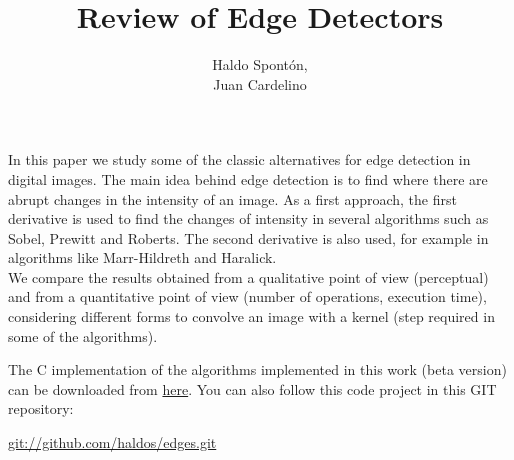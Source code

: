 \documentclass{ipol}
\numberwithin{equation}{section}
\numberwithin{table}{section}
\numberwithin{figure}{section}
\begin{document}


\title{Review of Edge Detectors}
\author{Haldo Spont\'on,\\
        Juan Cardelino}
\date{}
\ipolMaketitle

\begin{ipolAbstract}
In this paper we study some of the classic alternatives for edge detection in digital images. The main idea 
behind edge detection is to find where there are abrupt changes in the intensity of an image. 
As a first approach, the first derivative is used to find the changes of intensity in several algorithms 
such as Sobel, Prewitt and Roberts. The second derivative is also used, for example in algorithms 
like Marr-Hildreth and Haralick.\\
We compare the results obtained from a qualitative point of view (perceptual) and from a quantitative 
point of view (number of operations, execution time), considering different forms to convolve an 
image with a kernel (step required in some of the algorithms).\\
\end{ipolAbstract}

\begin{ipolCode}
The C implementation of the algorithms implemented in this work (beta version) can be
downloaded from \href{http://iie.fing.edu.uy/~haldos/downloads/edge_detectors_v0.1.tar.gz}{here}.
You can also follow this code project in this GIT repository: 
\begin{center}
\url{git://github.com/haldos/edges.git}
\end{center}
\end{ipolCode}

\end{document}

